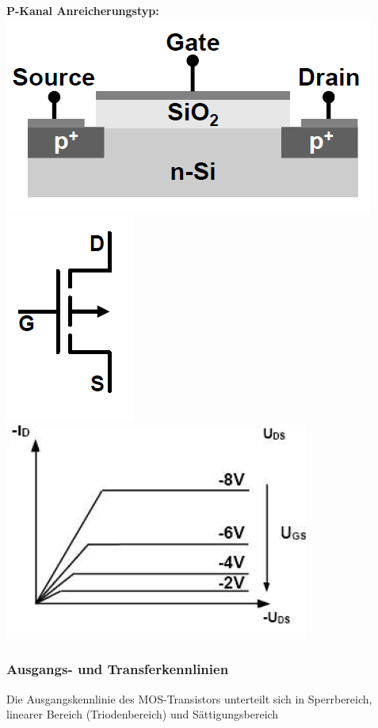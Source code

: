 		
		\textbf{P-Kanal Anreicherungstyp:}
		\newline
		\includegraphics[width=0.35\linewidth]{Kapitel/Kap06/AnreicherungPKanalSchnitt}
		\includegraphics[width=0.125\linewidth]{Kapitel/Kap06/AnreicherungPKanalSchaltsymbol}
		\includegraphics[width=0.325\linewidth]{Kapitel/Kap06/AnreicherungPKanalKennlinie}
		
		 

	\subsubsection{Ausgangs- und Transferkennlinien}
		Die Ausgangskennlinie des MOS-Transistors unterteilt sich in Sperrbereich, linearer Bereich (Triodenbereich) und Sättigungsbereich

